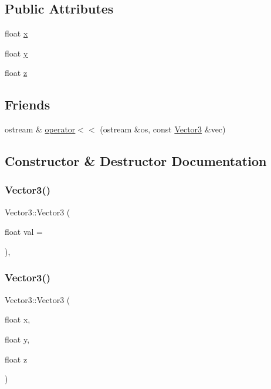 \subsection*{Public Attributes}
\begin{DoxyCompactItemize}
\item 
float \hyperlink{class_vector3_a7e2d3237b29a2f29d7b3d8b2934e35f2}{x}
\item 
float \hyperlink{class_vector3_a86eb35a9fa2d5a49e7fad66a35fa9c13}{y}
\item 
float \hyperlink{class_vector3_aa8c9461eb24bd2c364258078811a3e9d}{z}
\end{DoxyCompactItemize}
\subsection*{Friends}
\begin{DoxyCompactItemize}
\item 
ostream \& \hyperlink{class_vector3_af8071adba02246ed84b6ac3e3f8d4737}{operator$<$$<$} (ostream \&os, const \hyperlink{class_vector3}{Vector3} \&vec)
\end{DoxyCompactItemize}


\subsection{Constructor \& Destructor Documentation}
\mbox{\label{class_vector3_a0e04c223104cd5f8089e8a34069e0d31}} 
\subsubsection{\texorpdfstring{Vector3()}{Vector3()}\hspace{0.1cm}{\footnotesize\ttfamily [1/2]}}
{\footnotesize\ttfamily Vector3\+::\+Vector3 (\begin{DoxyParamCaption}\item[{float}]{val = {} }\end{DoxyParamCaption})\hspace{0.3cm}{\ttfamily [inline]}, {\ttfamily [explicit]}}

\mbox{\label{class_vector3_ad53e22b52babdb90d423601f72467590}} 
\subsubsection{\texorpdfstring{Vector3()}{Vector3()}\hspace{0.1cm}{\footnotesize\ttfamily [2/2]}}
{\footnotesize\ttfamily Vector3\+::\+Vector3 (\begin{DoxyParamCaption}\item[{float}]{x,  }\item[{float}]{y,  }\item[{float}]{z }\end{DoxyParamCaption})\hspace{0.3cm}{\ttfamily [inline]}}



